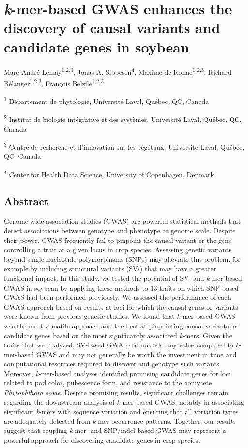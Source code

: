 \chapter*{\textit{k}-mer-based GWAS enhances the discovery of causal variants and candidate genes in soybean}
\label{kmer-gwas}

Marc-André Lemay\textsuperscript{1,2,3},
Jonas A. Sibbesen\textsuperscript{4},
Maxime de Ronne\textsuperscript{1,2,3},
Richard Bélanger\textsuperscript{1,2,3},
François Belzile\textsuperscript{1,2,3}

\textsuperscript{1} Département de phytologie, Université Laval, Québec, QC, Canada

\textsuperscript{2} Institut de biologie intégrative et des systèmes, Université Laval, Québec, QC, Canada

\textsuperscript{3} Centre de recherche et d’innovation sur les végétaux, Université Laval, Québec, QC, Canada

\textsuperscript{4} Center for Health Data Science, University of Copenhagen, Denmark

\clearpage

\section*{Abstract}

Genome-wide association studies (GWAS) are powerful statistical methods
that detect associations between genotype and phenotype at genome scale. Despite
their power, GWAS frequently fail to pinpoint the causal variant or the gene
controlling a trait at a given locus in crop species. Assessing genetic variants beyond
single-nucleotide polymorphisms (SNPs) may alleviate this problem,
for example by including structural variants (SVs) that may have a greater functional impact.
In this study, we tested the potential
of SV- and \emph{k}-mer-based GWAS in soybean by applying these methods to 13
traits on which SNP-based GWAS had been performed previously.
We assessed the performance of each GWAS approach based on results at loci for which
the causal genes or variants were known from previous genetic studies. We found
that \emph{k}-mer-based GWAS was the most versatile approach and the best at pinpointing
causal variants or candidate genes based on the most significantly
associated \emph{k}-mers. Given the traits that we analyzed, SV-based GWAS did not add any value
compared to \textit{k}-mer-based GWAS and may not generally be worth the investment in time and
computational resources required to discover and genotype such variants.
Moreover, \textit{k}-mer-based analyses
identified promising candidate genes for loci related
to pod color, pubescence form, and resistance to the oomycete
\textit{Phytophthora sojae}. Despite promising results,
significant challenges remain regarding the downstream analysis of
\emph{k}-mer-based GWAS, notably in associating significant \emph{k}-mers with
sequence variation and ensuring that all variation types are adequately
detected from \emph{k}-mer occurrence patterns. Together, our results suggest
that coupling \emph{k}-mer- and SNP/indel-based GWAS may represent a
powerful approach for discovering candidate genes in crop species.

